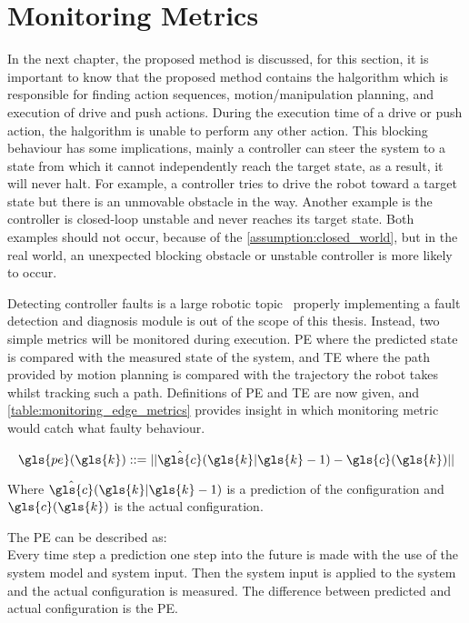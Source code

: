 \section{Monitoring Metrics}%
\label{sec:fault_detection}
In the next chapter, the proposed method is discussed, for this section, it is important to know that the proposed method contains the \ac{halgorithm} which is responsible for finding action sequences, motion/manipulation planning, and execution of drive and push actions. During the execution time of a drive or push action, the \acl{halgorithm} is unable to perform any other action. This blocking behaviour has some implications, mainly a controller can steer the system to a state from which it cannot independently reach the target state, as a result, it will never halt. For example, a controller tries to drive the robot toward a target state but there is an unmovable obstacle in the way. Another example is the controller is closed-loop unstable and never reaches its target state. Both examples should not occur, because of the \cref{assumption:closed_world}, but in the real world, an unexpected blocking obstacle or unstable controller is more likely to occur.\bs

Detecting controller faults is a large robotic topic~\cite{khalastchi_fault_2019} properly implementing a fault detection and diagnosis module is out of the scope of this thesis. Instead, two simple metrics will be monitored during execution. \ac{PE} where the predicted state is compared with the measured state of the system, and \ac{TE} where the path provided by motion planning is compared with the trajectory the robot takes whilst tracking such a path. Definitions of \ac{PE} and \ac{TE} are now given, and \cref{table:monitoring_edge_metrics} provides insight in which monitoring metric would catch what faulty behaviour.\bs

\[ \gls{pe}(\gls{k}) ::= ||\hat{\gls{c}}(\gls{k}|\gls{k}-1) - \gls{c}(\gls{k})|| \]

Where $\hat{\gls{c}}(\gls{k}|\gls{k}-1)$ is a prediction of the configuration and $\gls{c}(\gls{k})$ is the actual configuration.\bs 

The \ac{PE} can be described as:\\
Every time step a prediction one step into the future is made with the use of the system model and system input. Then the system input is applied to the system and the actual configuration is measured. The difference between predicted and actual configuration is the \ac{PE}.

